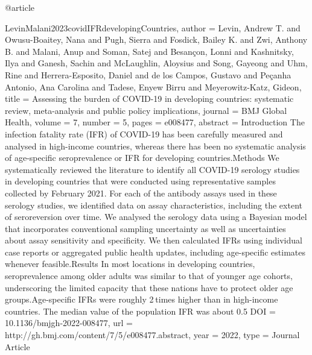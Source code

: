 {{@article{LevinMalani2023covidIFRdevelopingCountries,
   author = {Levin, Andrew T. and Owusu-Boaitey, Nana and Pugh, Sierra and Fosdick, Bailey K. and Zwi, Anthony B. and Malani, Anup and Soman, Satej and Besançon, Lonni and Kashnitsky, Ilya and Ganesh, Sachin and McLaughlin, Aloysius and Song, Gayeong and Uhm, Rine and Herrera-Esposito, Daniel and de los Campos, Gustavo and Peçanha Antonio, Ana Carolina and Tadese, Enyew Birru and Meyerowitz-Katz, Gideon},
   title = {Assessing the burden of COVID-19 in developing countries: systematic review, meta-analysis and public policy implications},
   journal = {BMJ Global Health},
   volume = {7},
   number = {5},
   pages = {e008477},
   abstract = {Introduction The infection fatality rate (IFR) of COVID-19 has been carefully measured and analysed in high-income countries, whereas there has been no systematic analysis of age-specific seroprevalence or IFR for developing countries.Methods We systematically reviewed the literature to identify all COVID-19 serology studies in developing countries that were conducted using representative samples collected by February 2021. For each of the antibody assays used in these serology studies, we identified data on assay characteristics, including the extent of seroreversion over time. We analysed the serology data using a Bayesian model that incorporates conventional sampling uncertainty as well as uncertainties about assay sensitivity and specificity. We then calculated IFRs using individual case reports or aggregated public health updates, including age-specific estimates whenever feasible.Results In most locations in developing countries, seroprevalence among older adults was similar to that of younger age cohorts, underscoring the limited capacity that these nations have to protect older age groups.Age-specific IFRs were roughly 2 times higher than in high-income countries. The median value of the population IFR was about 0.5%
   DOI = {10.1136/bmjgh-2022-008477},
   url = {http://gh.bmj.com/content/7/5/e008477.abstract},
   year = {2022},
   type = {Journal Article}
}

}}}
